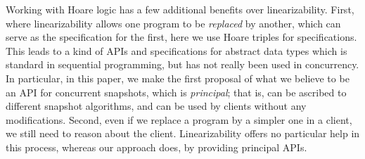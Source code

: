 Working with Hoare logic has a few additional benefits over
linearizability. First, where linearizability allows one program to be
\emph{replaced} by another, which can serve as the specification for
the first, here we use Hoare triples for specifications. This leads to
a kind of APIs and specifications for abstract data types which is
standard in sequential programming, but has not really been used in
concurrency. In particular, in this paper, we make the first proposal
of what we believe to be an API for concurrent snapshots, which is
\emph{principal}; that is, can be ascribed to different snapshot
algorithms, and can be used by clients without any modifications.
%
Second, even if we replace a program by a simpler one in a client, we
still need to reason about the client. Linearizability offers no
particular help in this process,
%
whereas our approach does, by providing principal APIs.
%
%


